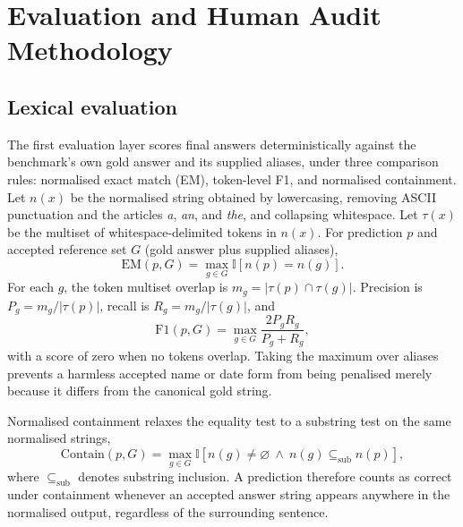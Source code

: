 \chapter{Evaluation and Human Audit Methodology}
\label{chap:evaluation}

\section{Lexical evaluation}
\label{sec:lexical}

The first evaluation layer scores final answers deterministically against the benchmark's own gold answer and its supplied aliases, under three comparison rules: normalised exact match (EM), token-level F1, and normalised containment. Let $n(x)$ be the normalised string obtained by lowercasing, removing ASCII punctuation and the articles \emph{a}, \emph{an}, and \emph{the}, and collapsing whitespace. Let $\tau(x)$ be the multiset of whitespace-delimited tokens in $n(x)$. For prediction $p$ and accepted reference set $G$ (gold answer plus supplied aliases),
\begin{equation}
  \mathrm{EM}(p,G)=\max_{g\in G}\mathbb{I}[n(p)=n(g)].
\end{equation}
For each $g$, the token multiset overlap is $m_g=|\tau(p)\cap\tau(g)|$. Precision is $P_g=m_g/|\tau(p)|$, recall is $R_g=m_g/|\tau(g)|$, and
\begin{equation}
  \mathrm{F1}(p,G)=\max_{g\in G}\frac{2P_gR_g}{P_g+R_g},
\end{equation}
with a score of zero when no tokens overlap. Taking the maximum over aliases prevents a harmless accepted name or date form from being penalised merely because it differs from the canonical gold string.

Normalised containment relaxes the equality test to a substring test on the same normalised strings,
\begin{equation}
  \mathrm{Contain}(p,G)=\max_{g\in G}\mathbb{I}\left[n(g)\neq\varnothing \ \wedge\ n(g)\subseteq_{\mathrm{sub}} n(p)\right],
  \label{eq:containment}
\end{equation}
where $\subseteq_{\mathrm{sub}}$ denotes substring inclusion. A prediction therefore counts as correct under containment whenever an accepted answer string appears anywhere in the normalised output, regardless of the surrounding sentence.


